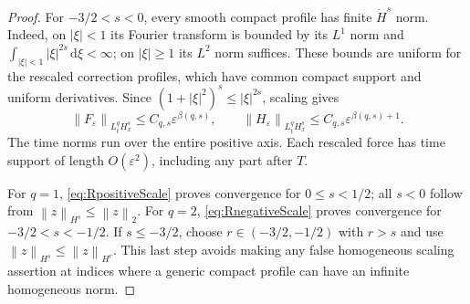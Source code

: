\documentclass[11pt,a4paper]{article}
\theoremstyle{definition}\newtheorem{definition}[theorem]{Definition}
\theoremstyle{remark}\newtheorem{remark}[theorem]{Remark}
\newcommand{\dd}{\,\mathrm d}\newcommand{\eps}{\varepsilon}
\newcommand{\norm}[1]{\left\lVert#1\right\rVert}
\begin{document}
\begin{proof}
For $-3/2<s<0$, every smooth compact profile has finite $\dot H^s$ norm. Indeed, on $|\xi|<1$ its Fourier transform is bounded by its $L^1$ norm and $\int_{|\xi|<1}|\xi|^{2s}\dd\xi<\infty$; on $|\xi|\ge1$ its $L^2$ norm suffices. These bounds are uniform for the rescaled correction profiles, which have common compact support and uniform derivatives. Since
$(1+|\xi|^2)^s\le|\xi|^{2s}$, scaling gives
\begin{equation}\label{eq:RnegativeScale}
 \norm{F_\eps}_{L^q_tH^s_x}\le C_{q,s}\eps^{\beta(q,s)},\qquad
 \norm{H_\eps}_{L^q_tH^s_x}\le C_{q,s}\eps^{\beta(q,s)+1}.
\end{equation}
The time norms run over the entire positive axis. Each rescaled force has time support of length $O(\eps^2)$, including any part after $T$.

For $q=1$, \eqref{eq:RpositiveScale} proves convergence for $0\le s<1/2$; all $s<0$ follow from $\norm{z}_{H^s}\le\norm{z}_2$. For $q=2$, \eqref{eq:RnegativeScale} proves convergence for $-3/2<s<-1/2$. If $s\le-3/2$, choose $r\in(-3/2,-1/2)$ with $r>s$ and use $\norm{z}_{H^s}\le\norm{z}_{H^r}$. This last step avoids making any false homogeneous scaling assertion at indices where a generic compact profile can have an infinite homogeneous norm.
\end{proof}
\end{document}
